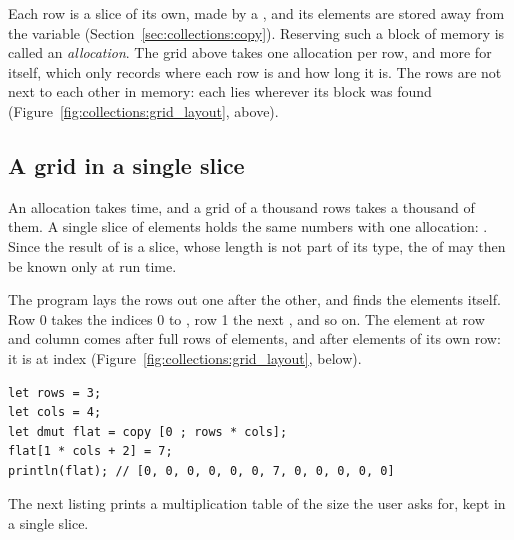 Each row is a slice of its own, made by a , and its elements are
stored away from the variable (Section~\ref{sec:collections:copy}). Reserving
such a block of memory is called an \textit{allocation}. The grid above takes
one allocation per row, and more for  itself, which only records
where each row is and how long it is. The rows are not next to each other in
memory: each lies wherever its block was found
(Figure~\ref{fig:collections:grid_layout}, above).


\subsection{A grid in a single slice}
\label{sec:collections:flat_grid}

An allocation takes time, and a grid of a thousand rows takes a thousand of
them. A single slice of  elements holds the same numbers
with one allocation: . Since the result of
 is a slice, whose length is not part of its type, the  of
\token{[v ; n]} may then be known only at run time.

The program lays the rows out one after the other, and finds the elements
itself. Row 0 takes the indices 0 to , row 1 the next
, and so on. The element at row  and column 
comes after  full rows of  elements, and after 
elements of its own row: it is at index 
(Figure~\ref{fig:collections:grid_layout}, below).

\begin{lstlisting}[style=coloredverbatim]
let rows = 3;
let cols = 4;
let dmut flat = copy [0 ; rows * cols];
flat[1 * cols + 2] = 7;
println(flat); // [0, 0, 0, 0, 0, 0, 7, 0, 0, 0, 0, 0]
\end{lstlisting}



The next listing prints a multiplication table of the size the user asks for,
kept in a single slice.

